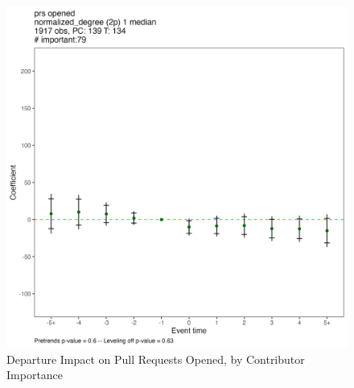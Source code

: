 \begin{figure}[htbp]
\begin{minipage}[b]{0.32\textwidth}
    \end{minipage}
    \hfill
    \begin{minipage}[b]{0.32\textwidth}
        \centering
        \includegraphics[width=\textwidth]{temp/normalized_degree_val/all_normalized_degree_2p_1_median.png}
    \end{minipage}
    
    \caption{Departure Impact on Pull Requests Opened, by Contributor Importance}
    \label{fig:prs_opened_more_imp}
\end{figure}
